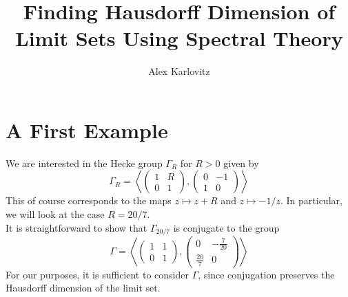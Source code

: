 \documentclass[]{article}
\title{Finding Hausdorff Dimension of Limit Sets Using Spectral Theory}
\author{Alex Karlovitz}
\date{}
\begin{document}
	
	\maketitle

\section{A First Example}

We are interested in the Hecke group $\Gamma_R$ for $R > 0$ given by
\[
	\Gamma_R = \left\langle
	\begin{pmatrix}
		1 & R \\
		0 & 1
	\end{pmatrix},
	\begin{pmatrix}
		0 & -1 \\
		1 & 0
	\end{pmatrix}
	\right\rangle
\]
This of course corresponds to the maps $z \mapsto z + R$ and $z \mapsto -1/z$.
In particular, we will look at the case $R = 20/7$.
\\

It is straightforward to show that $\Gamma_{20/7}$ is conjugate to the group
\[
	\Gamma = \left\langle
	\begin{pmatrix}
		1 & 1 \\
		0 & 1
	\end{pmatrix},
	\begin{pmatrix}
		0 & -\frac{7}{20} \\
		\frac{20}{7} & 0
	\end{pmatrix}
	\right\rangle
\]
For our purposes, it is sufficient to consider $\Gamma$, since conjugation preserves the Hausdorff dimension of the limit set.
\\
\end{document}
